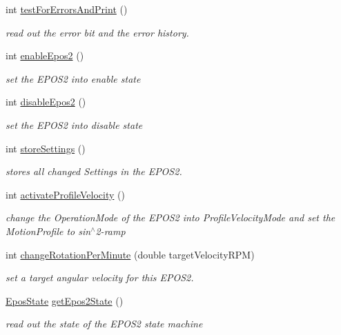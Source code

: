 \begin{DoxyCompactItemize}
int \hyperlink{classEpos2MotorController_a481615a590e6d1c6bf6c39c426e6d9a6}{test\-For\-Errors\-And\-Print} ()
\begin{DoxyCompactList}\small\item\em read out the error bit and the error history. \end{DoxyCompactList}\item 
int \hyperlink{classEpos2MotorController_aeadc7a21fa6619a4104887f169b9d2fd}{enable\-Epos2} ()
\begin{DoxyCompactList}\small\item\em set the E\-P\-O\-S2 into enable state \end{DoxyCompactList}\item 
int \hyperlink{classEpos2MotorController_ad58ad9fe38c72ce0d457a286973f8a99}{disable\-Epos2} ()
\begin{DoxyCompactList}\small\item\em set the E\-P\-O\-S2 into disable state \end{DoxyCompactList}\item 
int \hyperlink{classEpos2MotorController_a2e1ad71a3be2943ed7bffd743c4f1fad}{store\-Settings} ()
\begin{DoxyCompactList}\small\item\em stores all changed Settings in the E\-P\-O\-S2. \end{DoxyCompactList}\item 
int \hyperlink{classEpos2MotorController_a4f3a4529154e01acb6a15ff94d5c9000}{activate\-Profile\-Velocity} ()
\begin{DoxyCompactList}\small\item\em change the Operation\-Mode of the E\-P\-O\-S2 into Profile\-Velocity\-Mode and set the Motion\-Profile to sin$^\wedge$2-\/ramp \end{DoxyCompactList}\item 
int \hyperlink{classEpos2MotorController_a1b97f5c8fe0c7e2ff3256334c19b7a39}{change\-Rotation\-Per\-Minute} (double target\-Velocity\-R\-P\-M)
\begin{DoxyCompactList}\small\item\em set a target angular velocity for this E\-P\-O\-S2. \end{DoxyCompactList}\item 
\hyperlink{classEpos2MotorController_ab5ec630dfbb90ad674e311187926060c}{Epos\-State} \hyperlink{classEpos2MotorController_ac6c31e0dc57485aa817431b22627fc70}{get\-Epos2\-State} ()
\begin{DoxyCompactList}\small\item\em read out the state of the E\-P\-O\-S2 state machine \end{DoxyCompactList}\item 

\end{DoxyCompactItemize}
